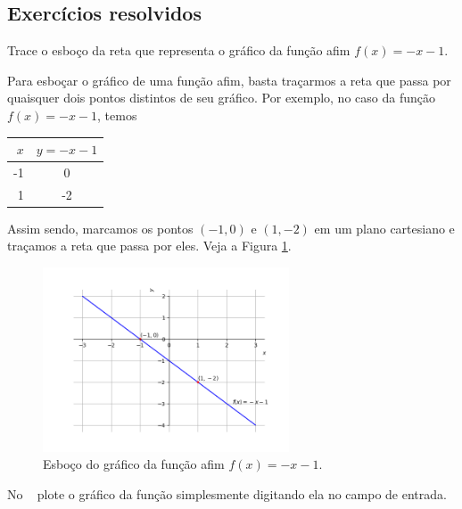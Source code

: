 \documentclass[../main.tex]{subfiles}
\begin{document}
\subsection{Exercícios resolvidos}
\begin{exeresol}
Trace o esboço da reta que representa o gráfico da função afim $f(x) = -x-1$.\\  
\begin{resol}
  Para esboçar o gráfico de uma função afim, basta traçarmos a reta que passa por quaisquer dois pontos distintos de seu gráfico. Por exemplo, no caso da função $f(x) = -x -1$, temos
  \begin{center}
  \begin{tabular}[H]{r|c}
    $x$ & $y = -x-1$\\\hline
    -1  & 0\\
    1   & -2\\\hline
  \end{tabular}
\end{center}
Assim sendo, marcamos os pontos $(-1, 0)$ e $(1, -2)$ em um plano cartesiano e traçamos a reta que passa por eles. Veja a Figura \ref{fig:exeresol_funafim_grafico}.
\begin{figure}[htb]
  \centering
  \includegraphics[width=0.65\textwidth]{fig_func/fig_exeresol_funafim_grafico}
  \caption{Esboço do gráfico da função afim $f(x)=-x-1$.}
  \label{fig:exeresol_funafim_grafico}
\end{figure}

\dica No \geogebra~ plote o gráfico da função simplesmente digitando ela no campo de entrada.
\end{resol}
\end{exeresol}
\end{document}
